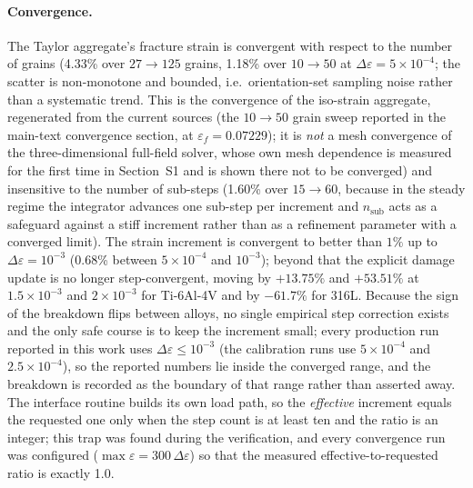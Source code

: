 \documentclass[12pt,a4paper,twocolumn]{article}
\begin{document}
\paragraph{Convergence.} The Taylor aggregate's fracture strain is convergent with respect to the number of grains (4.33\%
over $27 \to 125$ grains, 1.18\% over $10 \to 50$ at $\Delta\varepsilon = 5\times10^{-4}$; the scatter is
non-monotone and bounded, i.e.\ orientation-set sampling noise rather than a systematic trend. This is the convergence of the iso-strain aggregate, regenerated from the current sources (the $10\to50$ grain sweep reported in the main-text convergence section, at $\varepsilon_f=0.07229$); it is \emph{not} a mesh convergence of the three-dimensional full-field solver, whose own mesh dependence is measured for the first time in Section~S1 and is shown there not to be converged) and
insensitive to the number of sub-steps (1.60\% over $15 \to 60$, because in the steady regime the
integrator advances one sub-step per increment and $n_{\mathrm{sub}}$ acts as a safeguard against a stiff
increment rather than as a refinement parameter with a converged limit). The strain increment is
convergent to better than $1\%$ up to $\Delta\varepsilon = 10^{-3}$ (0.68\% between $5\times10^{-4}$ and
$10^{-3}$); beyond that the explicit damage update is no longer step-convergent, moving by $+13.75\%$ and
$+53.51\%$ at $1.5\times10^{-3}$ and $2\times10^{-3}$ for Ti-6Al-4V and by $-61.7\%$ for 316L. Because
the sign of the breakdown flips between alloys, no single empirical step correction exists and the only
safe course is to keep the increment small; every production run reported in this work uses
$\Delta\varepsilon \le 10^{-3}$ (the calibration runs use $5\times10^{-4}$ and $2.5\times10^{-4}$), so
the reported numbers lie inside the converged range, and the breakdown is recorded as the boundary of
that range rather than asserted away. The interface routine builds its own load path, so the
\emph{effective} increment equals the requested one only when the step count is at least ten and the
ratio is an integer; this trap was found during the verification, and every convergence run was
configured ($\max\varepsilon = 300\,\Delta\varepsilon$) so that the measured effective-to-requested
ratio is exactly 1.0.
\end{document}
